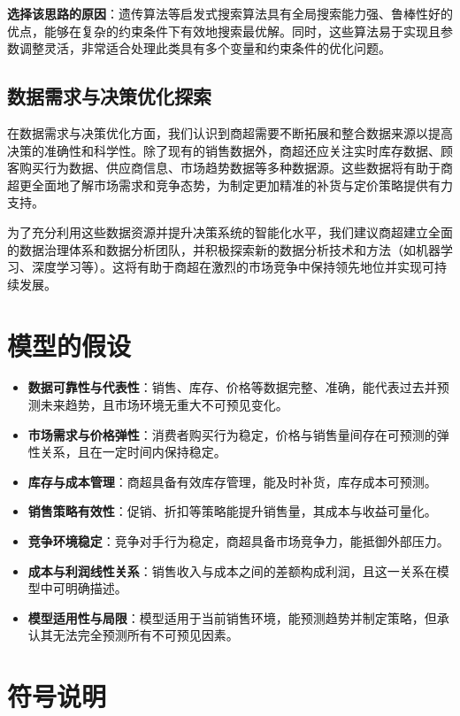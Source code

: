 \documentclass{cumcmthesis}
\begin{document}
\textbf{选择该思路的原因}：遗传算法等启发式搜索算法具有全局搜索能力强、鲁棒性好的优点，能够在复杂的约束条件下有效地搜索最优解。同时，这些算法易于实现且参数调整灵活，非常适合处理此类具有多个变量和约束条件的优化问题。

\subsection{数据需求与决策优化探索}

在数据需求与决策优化方面，我们认识到商超需要不断拓展和整合数据来源以提高决策的准确性和科学性。除了现有的销售数据外，商超还应关注实时库存数据、顾客购买行为数据、供应商信息、市场趋势数据等多种数据源。这些数据将有助于商超更全面地了解市场需求和竞争态势，为制定更加精准的补货与定价策略提供有力支持。

为了充分利用这些数据资源并提升决策系统的智能化水平，我们建议商超建立全面的数据治理体系和数据分析团队，并积极探索新的数据分析技术和方法（如机器学习、深度学习等）。这将有助于商超在激烈的市场竞争中保持领先地位并实现可持续发展。

\section{模型的假设}

\begin{itemize}
\item 	\textbf{数据可靠性与代表性}：销售、库存、价格等数据完整、准确，能代表过去并预测未来趋势，且市场环境无重大不可预见变化。
\item 	\textbf{市场需求与价格弹性}：消费者购买行为稳定，价格与销售量间存在可预测的弹性关系，且在一定时间内保持稳定。
\item 	\textbf{库存与成本管理}：商超具备有效库存管理，能及时补货，库存成本可预测。
\item 	\textbf{销售策略有效性}：促销、折扣等策略能提升销售量，其成本与收益可量化。
\item 	\textbf{竞争环境稳定}：竞争对手行为稳定，商超具备市场竞争力，能抵御外部压力。
\item 	\textbf{成本与利润线性关系}：销售收入与成本之间的差额构成利润，且这一关系在模型中可明确描述。
\item 	\textbf{模型适用性与局限}：模型适用于当前销售环境，能预测趋势并制定策略，但承认其无法完全预测所有不可预见因素。
\end{itemize}

\section{符号说明}
\end{document}
